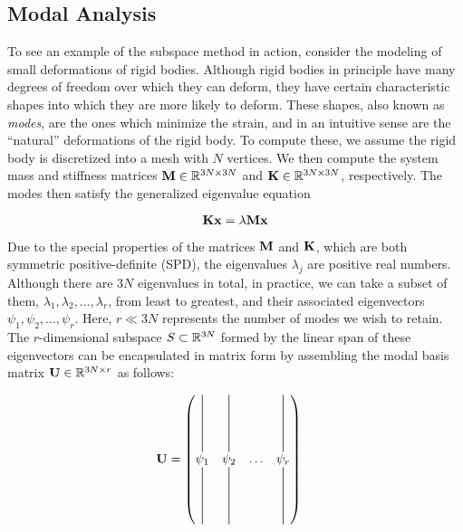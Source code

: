 \subsection{Modal Analysis}
To see an example of the subspace method in action, consider the modeling of small deformations of rigid bodies. Although rigid bodies in principle have many degrees of freedom over which they can deform, they have certain characteristic shapes into which they are more likely to deform. These shapes, also known as {\em modes}, are the ones which minimize the strain, and in an intuitive sense are the ``natural'' deformations of the rigid body. To compute these, we assume the rigid body is discretized into a mesh with $N$ vertices. We then compute the system mass and stiffness matrices $\mathbf{M} \in \mathbb{R}^{3N \times 3N}$ and $\mathbf{K} \in \mathbb{R}^{3N \times 3N}$, respectively. The modes then satisfy the generalized eigenvalue equation

\begin{equation}
	\mathbf{K} \mathbf{x} = \lambda \mathbf{M} \mathbf{x}
\end{equation}

Due to the special properties of the matrices $\mathbf{M}$ and $\mathbf{K}$, which are both symmetric positive-definite (SPD), the eigenvalues $\lambda_j$ are positive real numbers. Although there are $3N$ eigenvalues in total, in practice, we can take a subset of them, $\lambda_1, \lambda_2, \dots, \lambda_r$, from least to greatest, and their associated eigenvectors $\psi_1, \psi_2, \dots, \psi_r$. Here, $r \ll 3N$ represents the number of modes we wish to retain. The $r$-dimensional subspace $S \subset \mathbb{R}^{3N}$ formed by the linear span of these eigenvectors can be encapsulated in matrix form by assembling the modal basis matrix $\mathbf{U} \in \mathbb{R}^{3N \times r}$ as follows:


\begin{align}
	\UU &= \begin{pmatrix}
	\vertbar & \vertbar &   & \vertbar \\
	\psi_1 & \psi_2 & \dots & \psi_r   \\
	\vertbar & \vertbar &   & \vertbar
  \end{pmatrix}
\end{align}

